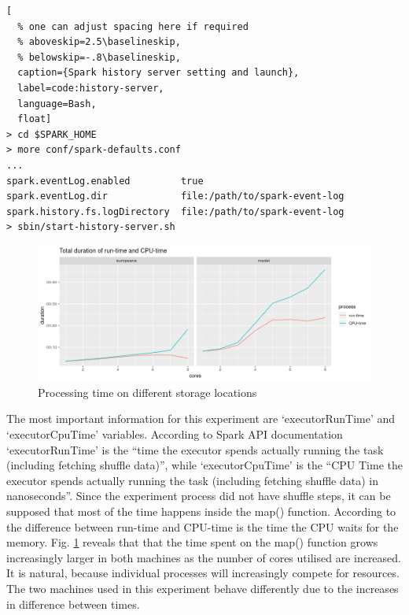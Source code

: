 \begin{lstlisting}[
  % one can adjust spacing here if required
  % aboveskip=2.5\baselineskip,
  % belowskip=-.8\baselineskip,
  caption={Spark history server setting and launch},
  label=code:history-server,
  language=Bash,
  float]
> cd $SPARK_HOME
> more conf/spark-defaults.conf
...
spark.eventLog.enabled         true
spark.eventLog.dir             file:/path/to/spark-event-log
spark.history.fs.logDirectory  file:/path/to/spark-event-log
> sbin/start-history-server.sh
\end{lstlisting}

\begin{figure}
\includegraphics[width=\textwidth]{images/chapter06/runtime-vs-cputime-absolute.png}
\caption{Processing time on different storage locations}
\label{runtime-vs-cputime-absolute}
\end{figure}

The most important information for this experiment are `executorRunTime' and `executorCpuTime' variables. According to Spark API documentation \cite{spark-taskmetrics} `executorRunTime' is the ``time the executor spends actually running the task (including fetching shuffle data)'', while `executorCpuTime' is the ``CPU Time the executor spends actually running the task (including fetching shuffle data) in nanoseconds''. Since the experiment process did not have shuffle steps, it can be supposed that most of the time happens inside the map() function. According to \cite{canali2017} the difference between run-time and CPU-time is the time the CPU waits for the memory. Fig. \ref{runtime-vs-cputime-absolute} reveals that that the time spent on the map() function grows increasingly larger in both machines as the number of cores utilised are increased. It is natural, because individual processes will increasingly compete for resources. The two machines used in this experiment behave differently due to the increases in difference between times.

